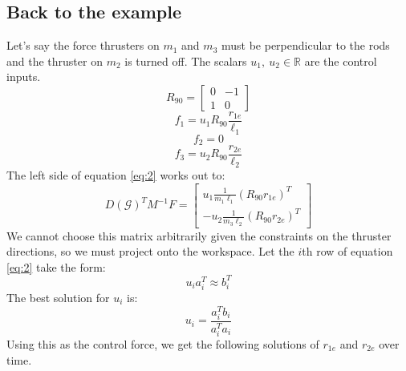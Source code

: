 \documentclass[conference]{IEEEtran}
\begin{document}
\subsection{Back to the example}
Let's say the force thrusters on $m_1$ and $m_3$ must be perpendicular to the rods and the thruster on $m_2$ is turned off. The scalars $u_1,\:u_2\in\mathbb{R}$ are the control inputs.
$$R_{90}=\begin{bmatrix}
    0 & -1\\ 1 & 0
\end{bmatrix}$$
$$f_1=u_1R_{90}\frac{r_{1e}}{\ell_1}$$
$$f_2=0$$
$$f_3=u_2R_{90}\frac{r_{2e}}{\ell_2}$$
The left side of equation \ref{eq:2} works out to:
$$D(\mathcal{G})^TM^{-1}F=\begin{bmatrix}
    u_1\frac{1}{m_1\ell_1}(R_{90}r_{1e})^T\\
    -u_2\frac{1}{m_3\ell_2}(R_{90}r_{2e})^T
\end{bmatrix}$$
We cannot choose this matrix arbitrarily given the constraints on the thruster directions, so we must project onto the workspace. Let the $i$th row of equation \ref{eq:2} take the form:
$$u_ia_i^T\approx b_i^T$$
The best solution for $u_i$ is:
$$u_i=\frac{a_i^Tb_i}{a_i^Ta_i}$$
Using this as the control force, we get the following solutions of $r_{1e}$ and $r_{2e}$ over time.
\end{document}
